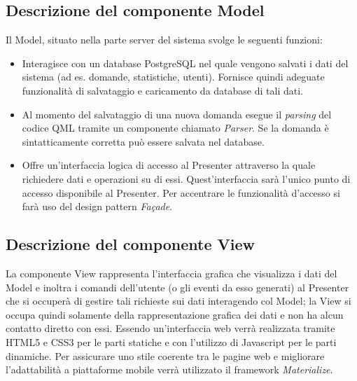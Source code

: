\documentclass[a4paper,11pt]{article}
\begin{document}
	\subsection{Descrizione del componente Model}
	Il Model, situato nella parte server del sistema svolge le seguenti funzioni:
	\begin{itemize}
		\item Interagisce con un database PostgreSQL nel quale vengono salvati i dati del sistema (ad es. domande, statistiche, utenti). Fornisce quindi adeguate funzionalità di salvataggio e caricamento da database di tali dati.
		\item Al momento del salvataggio di una nuova domanda esegue il \emph{parsing} del codice QML tramite un componente chiamato \emph{Parser}. Se la domanda è sintatticamente corretta può essere salvata nel database.
		\item Offre un'interfaccia logica di accesso al Presenter attraverso la quale richiedere dati e operazioni su di essi. Quest'interfaccia sarà l'unico punto di accesso disponibile al Presenter. Per accentrare le funzionalità d'accesso si farà uso del design pattern \emph{Façade}.
	\end{itemize}
	\subsection{Descrizione del componente View}
	La componente View rappresenta l'interfaccia grafica che visualizza i dati del Model e inoltra i comandi dell'utente (o gli eventi da esso generati) al Presenter che si occuperà di gestire tali richieste sui dati interagendo col Model; la View si occupa quindi solamente della rappresentazione grafica dei dati e non ha alcun contatto diretto con essi. Essendo un'interfaccia web verrà realizzata tramite HTML5 e CSS3 per le parti statiche e con l'utilizzo di Javascript per le parti dinamiche. Per assicurare uno stile coerente tra le pagine web e migliorare l'adattabilità a piattaforme mobile verrà utilizzato il framework \emph{Materialize}.
\end{document}
